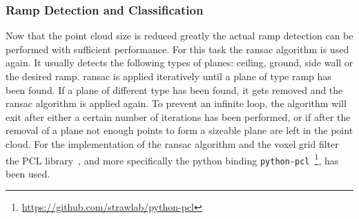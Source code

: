 \subsubsection{Ramp Detection and Classification}
\label{sssec:ramp_detecion_lidar}
Now that the point cloud size is reduced greatly the actual ramp detection can be performed with sufficient performance.
For this task the \gls{ransac} algorithm is used again.
It usually detects the following types of planes: ceiling, ground, side wall or the desired ramp.
\gls{ransac} is applied iteratively until a plane of type ramp has been found.
If a plane of different type has been found, it gets removed and the \gls{ransac} algorithm is applied again.
To prevent an infinite loop, the algorithm will exit after either a certain number of iterations has been performed, or if after the removal of a plane not enough points to form a sizeable plane are left in the point cloud.
For the implementation of the \gls{ransac} algorithm and the voxel grid filter the PCL library~\cite{Rusu2011}, and more specifically the python binding \texttt{python-pcl}~\footnote{\url{https://github.com/strawlab/python-pcl}}, has been used.

